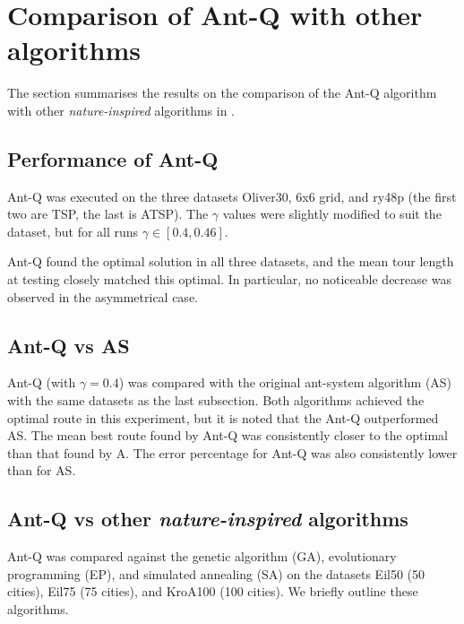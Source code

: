 \section{Comparison of Ant-Q with other algorithms}

The section summarises the results on the comparison of the Ant-Q algorithm with other \emph{nature-inspired} algorithms in \textcite{dorigo1996study}. 

\subsection{Performance of Ant-Q}

Ant-Q was executed on the three datasets Oliver30, 6x6 grid, and ry48p (the first two are TSP, the last is ATSP). The $\gamma$ values were slightly modified to suit the dataset, but for all runs $\gamma \in [0.4, 0.46]$.

Ant-Q found the optimal solution in all three datasets, and the mean tour length at testing closely matched this optimal. In particular, no noticeable decrease was observed in the asymmetrical case. 

\subsection{Ant-Q vs AS}

Ant-Q (with $\gamma = 0.4$) was compared with the original ant-system algorithm (AS) with the same datasets as the last subsection. Both algorithms achieved the optimal route in this experiment, but it is noted that the Ant-Q outperformed AS. The mean best route found by Ant-Q was consistently closer to the optimal than that found by A. The error percentage for Ant-Q was also consistently lower than for AS.

\subsection{Ant-Q vs other \emph{nature-inspired} algorithms}

Ant-Q was compared against the genetic algorithm (GA), evolutionary programming (EP), and simulated annealing (SA) on the datasets Eil50 (50 cities), Eil75 (75 cities), and KroA100 (100 cities). We briefly outline these algorithms.

